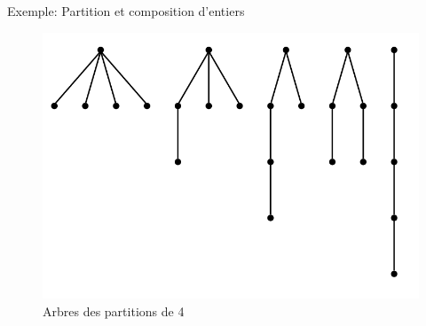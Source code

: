 \documentclass{beamer}
\begin{document}



\begin{frame}{Exemple: Partition et composition d'entiers}
\begin{figure}[h]
  \centering
  \includegraphics[scale=0.3]{chart1.png}
  \caption{Arbres des partitions de 4}
\end{figure}
\end{frame}
\end{document}
